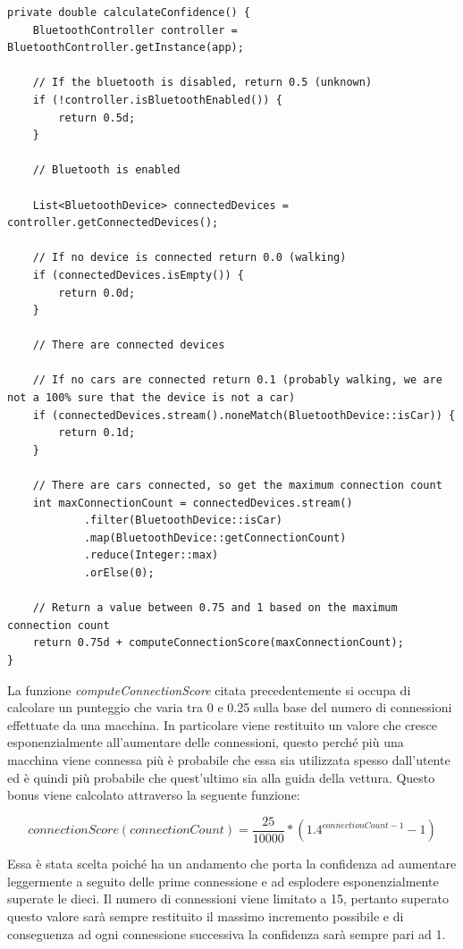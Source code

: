 \begin{verbatim}
private double calculateConfidence() {
    BluetoothController controller = BluetoothController.getInstance(app);

    // If the bluetooth is disabled, return 0.5 (unknown)
    if (!controller.isBluetoothEnabled()) {
        return 0.5d;
    }

    // Bluetooth is enabled

    List<BluetoothDevice> connectedDevices = controller.getConnectedDevices();

    // If no device is connected return 0.0 (walking)
    if (connectedDevices.isEmpty()) {
        return 0.0d;
    }

    // There are connected devices

    // If no cars are connected return 0.1 (probably walking, we are not a 100% sure that the device is not a car)
    if (connectedDevices.stream().noneMatch(BluetoothDevice::isCar)) {
        return 0.1d;
    }

    // There are cars connected, so get the maximum connection count
    int maxConnectionCount = connectedDevices.stream()
            .filter(BluetoothDevice::isCar)
            .map(BluetoothDevice::getConnectionCount)
            .reduce(Integer::max)
            .orElse(0);

    // Return a value between 0.75 and 1 based on the maximum connection count
    return 0.75d + computeConnectionScore(maxConnectionCount);
}
\end{verbatim}

La funzione \textit{computeConnectionScore} citata precedentemente si occupa di calcolare un punteggio che varia tra 0 e 0.25 sulla base del numero di connessioni effettuate da una macchina. In particolare viene restituito un valore che cresce esponenzialmente all'aumentare delle connessioni, questo perché più una macchina viene connessa più è probabile che essa sia utilizzata spesso dall'utente ed è quindi più probabile che quest'ultimo sia alla guida della vettura. Questo bonus viene calcolato attraverso la seguente funzione:

\[connectionScore(connectionCount) = \frac{25}{10000} * (1.4^{connectionCount-1} - 1)\]

Essa è stata scelta poiché ha un andamento che porta la confidenza ad aumentare leggermente a seguito delle prime connessione e ad esplodere esponenzialmente superate le dieci. Il numero di connessioni viene limitato a 15, pertanto superato questo valore sarà sempre restituito il massimo incremento possibile e di conseguenza ad ogni connessione successiva la confidenza sarà sempre pari ad 1. 

